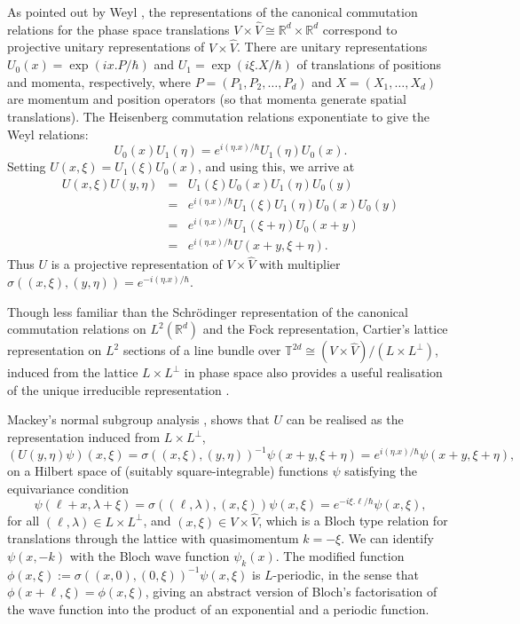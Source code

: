 \documentclass[11pt]{article}
\newcommand{\real}{{\mathbb R}}
\newcommand{\torus}{{\mathbb T}}
\newcommand{\wh}[1]{\widehat{#1}}
\begin{document}
As pointed out by Weyl \cite[\S IV.14]{W28}, the representations of the canonical commutation relations for the phase space translations $V\times \wh{V} \cong \real^{d}\times\real^d$ correspond to projective unitary representations of $V\times \wh{V}$.
There are unitary representations $U_0(x) = \exp(ix.P/\hbar)$ and $U_1 = \exp(i\xi.X/\hbar)$ of translations of positions and momenta, respectively, where $P=(P_1,P_2,\ldots,P_d)$ and $X=(X_1,\ldots,X_d)$ are momentum and position operators (so that momenta generate spatial translations).
The Heisenberg commutation relations exponentiate to give the Weyl relations:
$$
U_0(x)U_1(\eta) = e^{i(\eta.x)/\hbar}U_1(\eta)U_0(x).
$$
Setting $U(x,\xi) = U_1(\xi)U_0(x)$, and using this, we arrive at
\begin{eqnarray*}
U(x,\xi)U(y,\eta) &=&U_1(\xi) U_0(x)U_1(\eta)U_0(y)\\
&=& e^{i(\eta.x)/\hbar}U_1(\xi)U_1(\eta)U_0(x)U_0(y)\\
&=& e^{i(\eta.x)/\hbar}U_1(\xi+\eta)U_0(x+y)\\
&=& e^{i(\eta.x)/\hbar}U(x+y,\xi+\eta).
\end{eqnarray*}
Thus $U$ is a projective representation of $V\times \wh{V}$ with multiplier $\sigma((x,\xi),(y,\eta)) 
= e^{-i(\eta.x)/\hbar}$.

Though less familiar than the Schr\"odinger representation of the canonical commutation relations on $L^2(\real^d)$ and the Fock representation,  Cartier's lattice representation on $L^2$ sections of a line bundle over $\torus^{2d} \cong (V\times\wh{V})/(L\times L^\perp)$, induced from the lattice $L\times L^\perp$ in phase space also provides a useful realisation of the unique irreducible representation \cite{C66, M70}.

Mackey's normal subgroup analysis \cite{M58}, \cite[\S 12]{M70} shows that $U$ can be realised as the representation induced from $L\times L^\perp$,
$$
(U(y,\eta)\psi)(x,\xi) = \sigma((x,\xi),(y,\eta))^{-1}\psi(x+y,\xi+\eta)
 = e^{i(\eta.x)/\hbar}\psi(x+y,\xi+\eta),
$$ 
on a Hilbert space of (suitably square-integrable) functions $\psi$ satisfying the equivariance condition
$$
\psi(\ell+x,\lambda+\xi) = \sigma((\ell,\lambda),(x,\xi))\psi(x,\xi)
 = e^{-i\xi.\ell/\hbar}\psi(x,\xi),
 $$
for all $(\ell,\lambda)\in L\times L^\perp$, and $(x,\xi) \in V\times \wh{V}$, which is a Bloch type relation for translations through the lattice with quasimomentum $k=-\xi$.
We can identify $\psi(x,-k)$ with the Bloch wave function $\psi_k(x)$. The modified function
$\phi(x,\xi) := \sigma((x,0),(0,\xi))^{-1}\psi(x,\xi)$ 
is $L$-periodic, in the sense that $\phi(x+\ell,\xi) = \phi(x,\xi)$, giving an abstract version of Bloch's factorisation of the wave function into the product of an exponential and a periodic function. 
\end{document}
